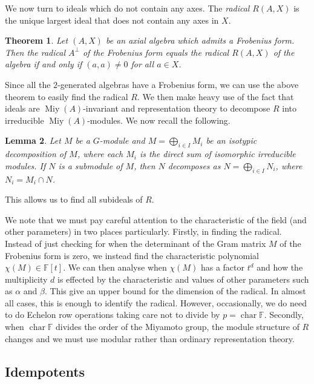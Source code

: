 \documentclass[11pt, a4paper]{article}
\theoremstyle{plain}
\newtheorem{theorem}{Theorem}[section]
\newtheorem{lemma}[theorem]{Lemma}
\theoremstyle{definition}
\newcommand\al{\alpha}
\newcommand\bt{\beta}
\DeclareMathOperator{\ch}{char}
\newcommand\FF{\mathbb{F}}
\DeclareMathOperator{\Miy}{Miy}
\newcommand{\0}{\overline{0}}
\newcommand{\2}{\overline{2}}
\newcommand{\1}{\mathbbm{1}}
\begin{document}
We now turn to ideals which do not contain any axes.  The \emph{radical} $R(A,X)$ is the unique largest ideal that does not contain any axes in $X$.

\begin{theorem}\textup{\cite[Theorem 4.9]{axialstructure}}
Let $(A,X)$ be an axial algebra which admits a Frobenius form.  Then the radical $A^\perp$ of the Frobenius form equals the radical $R(A,X)$ of the algebra if and only if $(a,a) \neq 0$ for all $a \in X$.
\end{theorem}

Since all the $2$-generated algebras have a Frobenius form, we can use the above theorem to easily find the radical $R$.  We then make heavy use of the fact that ideals are $\Miy(A)$-invariant and representation theory to decompose $R$ into irreducible $\Miy(A)$-modules.  We now recall the following.

\begin{lemma}
Let $M$ be a $G$-module and $M = \bigoplus_{i \in I} M_i$ be an isotypic decomposition of $M$, where each $M_i$ is the direct sum of isomorphic irreducible modules.  If $N$ is a submodule of $M$, then $N$ decomposes as $N = \bigoplus_{i \in I} N_i$, where $N_i = M_i \cap N$.
\end{lemma}

This allows us to find all subideals of $R$.

We note that we must pay careful attention to the characteristic of the field (and other parameters) in two places particularly.  Firstly, in finding the radical.  Instead of just checking for when the determinant of the Gram matrix $M$ of the Frobenius form is zero, we instead find the characteristic polynomial $\chi(M) \in \FF[t]$.  We can then analyse when $\chi(M)$ has a factor $t^d$ and how the multiplicity $d$ is effected by the characteristic and values of other parameters such as $\al$ and $\bt$.  This give an upper bound for the dimension of the radical.  In almost all cases, this is enough to identify the radical.  However, occasionally, we do need to do Echelon row operations taking care not to divide by $p = \ch \FF$.  Secondly, when $\ch \FF$ divides the order of the Miyamoto group, the module structure of $R$ changes and we must use modular rather than ordinary representation theory.





\subsection{Idempotents}
\end{document}
